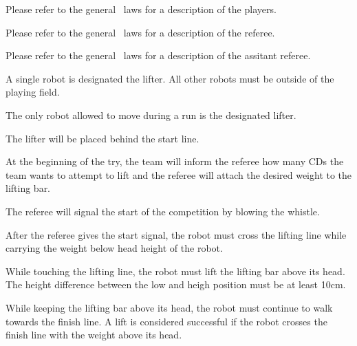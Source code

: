 \documentclass[12pt]{hurocup}
\begin{document}

Please refer to the general \HuroCup\ laws for a description of
the players.


Please refer to the general \HuroCup\ laws for a description of
the referee.


Please refer to the general \HuroCup\ laws for a description of
the assitant referee.


\begin{lawlist}[WL]

\item A single robot is designated the lifter. All other robots
  must be outside of the playing field.

\item The only robot allowed to move during a run is the
  designated lifter.

\item The lifter will be placed behind the start line.

\item At the beginning of the try, the team will inform the
 referee how many CDs the team wants to attempt to lift and the
 referee will attach the desired weight to the lifting bar.

\item The referee will signal the start of the competition by blowing
  the whistle.

\item After the referee gives the start signal, the robot must cross
 the lifting line while carrying the weight below head height of the
 robot.

\item While touching the lifting line, the robot must lift the lifting
 bar above its head. The height difference between the low and heigh
 position must be at least 10cm.

\item While keeping the lifting bar above its head, the robot must
 continue to walk towards the finish line. A lift is considered
 successful if the robot crosses the finish line with the weight above
 its head.


\end{lawlist}
\end{document}
